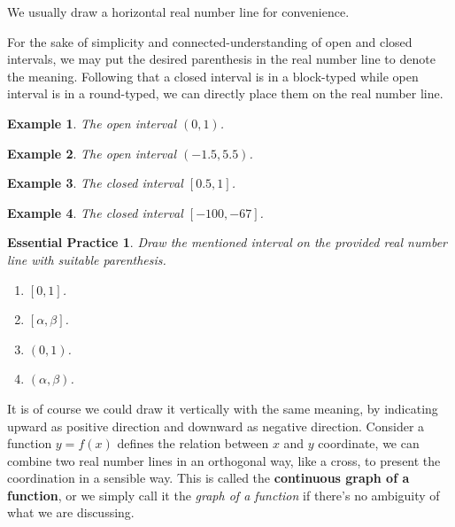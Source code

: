 \documentclass[12pt]{article}
\newtheorem*{example}{Example}
\newtheorem{exercise}{Essential Practice}[subsection]
\begin{document}
    We usually draw a horizontal real number line for convenience.

    \begin{figure}[H]
        \centering
    \end{figure}

    For the sake of simplicity and connected-understanding of open and closed intervals, we may put the desired parenthesis in the real number line to denote the meaning. Following that a closed interval is in a block-typed while open interval is in a round-typed, we can directly place them on the real number line.

    \begin{example}
        The open interval $(0,1)$.
    \end{example}

    \begin{example}
        The open interval $(-1.5,5.5)$.
    \end{example}

    \begin{example}
        The closed interval $[0.5,1]$.
    \end{example}

    \begin{example}
        The closed interval $[-100,-67]$.
    \end{example}

    \begin{exercise}
        Draw the mentioned interval on the provided real number line with suitable parenthesis.
        \begin{enumerate}
            \item $[0,1]$.
            \item $[\alpha,\beta]$.
            \item $(0,1)$.
            \item $(\alpha,\beta)$.
        \end{enumerate}
    \end{exercise}

    It is of course we could draw it vertically with the same meaning, by indicating upward as positive direction and downward as negative direction. Consider a function $y=f(x)$ defines the relation between $x$ and $y$ coordinate, we can combine two real number lines in an orthogonal way, like a cross, to present the coordination in a sensible way. This is called the \textbf{continuous graph of a function}, or we simply call it the \textit{graph of a function} if there's no ambiguity of what we are discussing.
\end{document}
